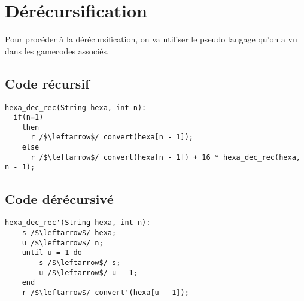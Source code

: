 \documentclass[a4paper, 11pt, oneside]{article}
\begin{document}
\section{Dérécursification}\label{derecur}
%
%
Pour procéder à la dérécursification, on va utiliser le pseudo langage qu'on a vu dans les gamecodes associés.

\subsection{Code récursif}

\lstset{escapeinside=//}
\begin{lstlisting}[language=Algol]
hexa_dec_rec(String hexa, int n):
  if(n=1)
    then 
      r /$\leftarrow$/ convert(hexa[n - 1]);
    else
      r /$\leftarrow$/ convert(hexa[n - 1]) + 16 * hexa_dec_rec(hexa, n - 1);
\end{lstlisting}

\subsection{Code dérécursivé}

\begin{lstlisting}[language=Custom]
hexa_dec_rec'(String hexa, int n):
    s /$\leftarrow$/ hexa;
    u /$\leftarrow$/ n;
    until u = 1 do
        s /$\leftarrow$/ s;
        u /$\leftarrow$/ u - 1;
    end
    r /$\leftarrow$/ convert'(hexa[u - 1]);
\end{lstlisting}
\end{document}
